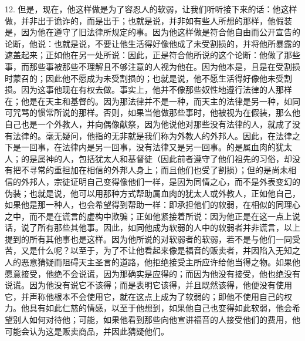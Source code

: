 12. 但是，现在，他这样做是为了容忍人的软弱，让我们听听接下来的话：他这样做，并非出于诡诈的，而是出于；也就是说，并非如有些人所想的那样，他假装是，因为他在遵守了旧法律所规定的事。因为他这样做是符合他自由而公开宣告的论断，他说：也就是说，不要让他生活得好像他成了未受割损的，并将他所暴露的遮盖起来；正如他在另一处所说：因此，正是符合他所说的这个论断：他做了那些事，而那些事被那些不理解且不够注意的人视为他在。因为他本是，且是在受割损时蒙召的；因此他不愿成为未受割损的；也就是说，他不愿生活得好像他未受割损。因为这事他现在有权去做。事实上，他并不像那些奴性地遵行法律的人那样在；他是在天主和基督的。因为那法律并不是一种，而天主的法律是另一种，如同可咒骂的惯常所说的那样。否则，如果当他做那些事时，他被视为在假装，那么他自己也是一个外教人，并向偶像献祭，因为他说他对那些没有法律的人，就成了没有法律的。毫无疑问，他指的无非就是我们称为外教人的外邦人。因此，在法律之下是一回事，在法律内是另一回事，没有法律又是另一回事。的是属血肉的犹太人；的是属神的人，包括犹太人和基督徒（因此前者遵守了他们祖先的习俗，却没有把不寻常的重担加在相信的外邦人身上；而且他们也受了割损）；但的是尚未相信的外邦人，宗徒证明自己变得像他们一样，是因为同情之心，而不是外表变幻的伪装；也就是说，他可以用那种方式帮助属血肉的犹太人或外教人，正如他自己，如果他是那一种人，也会希望得到帮助一样：即承担他们的软弱，在相似的同理心之中，而不是在谎言的虚构中欺骗；正如他紧接着所说：因为他正是在这一点上说话，说了所有那些其他事。因此，如同他成为软弱的人中的软弱者并非谎言，以上提到的所有其他事也是这样。因为他所说的对软弱者的软弱，若不是与他们一同受苦，又是什么呢？以至于，为了不让他看起来像是福音的贩卖者，并因陷入无知之人的恶意猜疑而阻碍天主圣言的道路，他拒绝接受主所应许给他当得之物。如果他愿意接受，他绝不会说谎，因为那确实是应得的；而因为他没有接受，他也绝没有说谎。因为他没有说它不该得；而是表明它该得，并且既然该得，他便没有使用它，并声称他根本不会使用它，就在这点上成为了软弱的；即他不使用自己的权力。他具有如此仁慈的情感，以至于他想到，如果他自己也变得如此软弱，他会希望别人如何对待他；可能，如果他看到那些向他宣讲福音的人接受他们的费用，他可能会认为这是贩卖商品，并因此猜疑他们。\par

